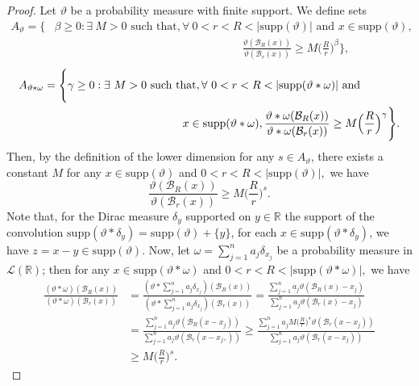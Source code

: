 \documentclass{amsproc}
\theoremstyle{definition}
\theoremstyle{remark}
\numberwithin{equation}{section}
\begin{document}
\begin{proof}
  Let $\vartheta$ be a probability measure with finite support. We define  sets 
   \begin{align*}
     A_{\vartheta} = \Bigg\{&\beta\ge0: \exists~ M>0 \text{ such that}, \forall~ 0<r<R<|\text{supp} (\vartheta)|\text{ and }x\in\text{supp}(\vartheta), \\&\hspace{7cm}\frac{\vartheta(\mathcal{B}_R(x))}{\vartheta(\mathcal{B}_r(x))}\ge M\Big(\frac{R}{r}\Big)^\beta\Bigg\},
 \end{align*}
  \begin{align*}
     A_{\vartheta*\omega} = \Bigg\{&\gamma\ge0:\exists~ M>0 \text{ such that}, \forall~ 0<r<R<|\text{supp} (\vartheta * \omega)|\text{ and } \\&\hspace{3.6cm}x\in\text{supp}(\vartheta *\omega), \frac{\vartheta*\omega(\mathcal{B}_R(x))}{\vartheta*\omega(\mathcal{B}_r(x))}\ge M\Big(\frac{R}{r}\Big)^\gamma\Bigg\}.
 \end{align*}
  Then, by the definition of the lower dimension for any $s \in A_{\vartheta}$, there exists a constant $M$ for any $x \in \text{supp}(\vartheta)$ and $0< r<R< |\text{supp}(\vartheta)|,$ we have
  \[
  \frac{\vartheta(\mathcal{B}_R(x))}{\vartheta(\mathcal{B}_r(x))} \ge M\bigg(\frac{R}{r}\bigg)^s.
  \] 
  Note that, for the Dirac measure $\delta_{y}$ supported on $y \in \mathbb{R}$ the support of the convolution $\text{supp}(\vartheta*\delta_{y})= \text{supp}(\vartheta) +\{y\}$, for each $x \in \text{supp}(\vartheta*\delta_{y})$, we have $z=x-y \in \text{supp}(\vartheta)$.
  Now, let $\omega = \sum_{j=1}^n a_j \delta_{x_j}$ be a probability measure in $\mathcal{L}(\mathbb{R})$; then for any $x \in \text{supp}(\vartheta*\omega)$ and $0<r < R< |\text{supp}(\vartheta*\omega)|,$ we have 
\begin{equation*}
    \begin{aligned}
      \frac{(\vartheta * \omega)(\mathcal{B}_R(x))}{(\vartheta * \omega)(\mathcal{B}_r(x))} &= \frac{(\vartheta * \sum_{j=1}^n a_j \delta_{x_j}) (\mathcal{B}_R(x))}{(\vartheta * \sum_{j=1}^n a_j \delta_{x_j}) (\mathcal{B}_r(x))} = \frac{\sum_{j=1}^n a_j \vartheta( \mathcal{B}_R(x)-x_j)}{\sum_{j=1}^n a_j \vartheta( \mathcal{B}_r(x)-x_j)} \\& = \frac{\sum_{j=1}^n a_j \vartheta( \mathcal{B}_R(x-x_j))}{\sum_{j=1}^n a_j \vartheta( \mathcal{B}_r(x- x_j,))}   \ge \frac{\sum_{j=1}^n a_j M \bigg(\frac{R}{r}\bigg)^s \vartheta(\mathcal{B}_r(x-x_j))}{\sum_{j=1}^n a_j \vartheta( \mathcal{B}_r(x- x_j))} \\& \ge M \bigg(\frac{R}{r}\bigg)^s.

\end{aligned}
\end{equation*}
\end{proof}
\end{document}
